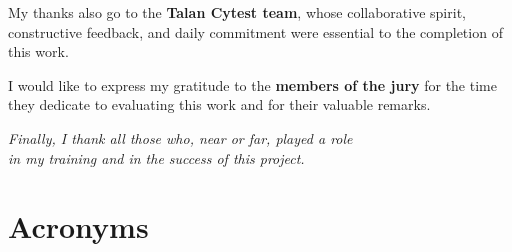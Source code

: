 \documentclass[12pt,a4paper]{report}
\begin{document}
\vspace{0.9cm}

My thanks also go to the \textbf{Talan Cytest team}, whose collaborative spirit,
constructive feedback, and daily commitment were essential to the completion
of this work.

\vspace{0.9cm}

I would like to express my gratitude to the \textbf{members of the jury} for the time
they dedicate to evaluating this work and for their valuable remarks.

\vspace{1.1cm}

\begin{flushright}
\itshape
Finally, I thank all those who, near or far, played a role\\
in my training and in the success of this project.
\end{flushright}

\newpage
\renewcommand{\contentsname}{Table of Contents}
\tableofcontents

\newpage
\renewcommand{\listfigurename}{List of Figures}
\listoffigures

\newpage
\renewcommand{\listtablename}{List of Tables}
\listoftables

\newpage
\thispagestyle{fancy}
\section*{Acronyms}
\end{document}

